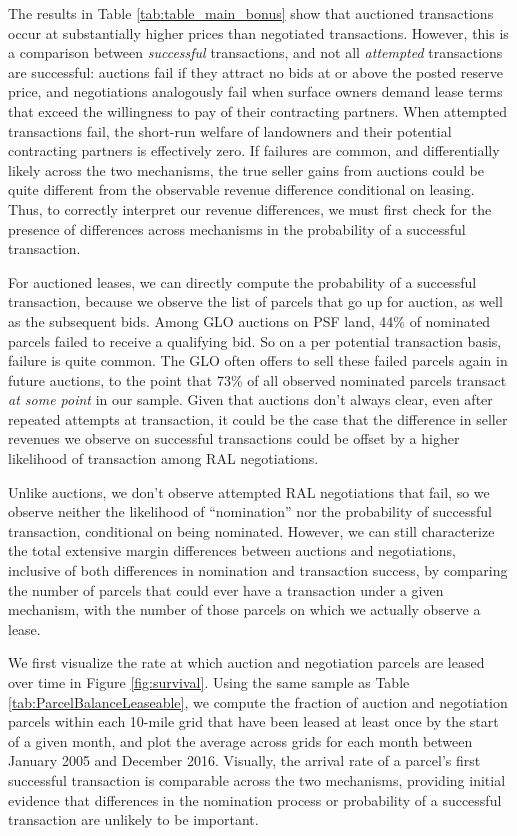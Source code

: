 \documentclass[12pt]{article}
\begin{document}
The results in Table \ref{tab:table_main_bonus} show that auctioned transactions occur at substantially higher prices than negotiated transactions.  However, this is a comparison between \textit{successful} transactions, and not all \textit{attempted} transactions are successful: auctions fail if they attract no bids at or above the posted reserve price, and negotiations analogously fail when surface owners demand lease terms that exceed the willingness to pay of their contracting partners.  When attempted transactions fail, the short-run welfare of landowners and their potential contracting partners is effectively zero. If failures are common, and differentially likely across the two mechanisms, the true seller gains from auctions could be quite different from the observable revenue difference conditional on leasing.  Thus, to correctly interpret our revenue differences,  we must first check for the presence of differences across mechanisms in the probability of a successful transaction.

For auctioned leases, we can directly compute the probability of a successful transaction, because we observe the list of parcels that go up for auction, as well as the subsequent bids.  Among GLO auctions on PSF land, 44\% of nominated parcels failed to receive a qualifying bid. So on a per potential transaction basis, failure is quite common.  The GLO often offers to sell these failed parcels again in future auctions, to the point that 73\% of all observed nominated parcels transact \textit{at some point} in our sample.  Given that auctions don't always clear, even after repeated attempts at transaction, it could be the case that the difference in seller revenues we observe on successful transactions could be offset by a higher likelihood of transaction among RAL negotiations. 

Unlike auctions, we don't observe attempted RAL negotiations that fail, so we observe neither the likelihood of ``nomination'' nor the probability of successful transaction, conditional on being nominated.  However, we can still characterize the total extensive margin differences between auctions and negotiations, inclusive of both differences in nomination and transaction success, by comparing the number of parcels that could ever have a transaction under a given mechanism, with the number of those parcels on which we actually observe a lease. 

We first visualize the rate at which auction and negotiation parcels are leased over time in Figure \ref{fig:survival}.  Using the same sample as Table \ref{tab:ParcelBalanceLeaseable}, we compute the fraction of auction and negotiation parcels within each 10-mile grid that have been leased at least once by the start of a given month, and plot the average across grids for each month between January 2005 and December 2016.  Visually, the arrival rate of a parcel's first successful transaction is comparable across the two mechanisms, providing initial evidence that differences in the nomination process or probability of a successful transaction are unlikely to be important. 
\end{document}

